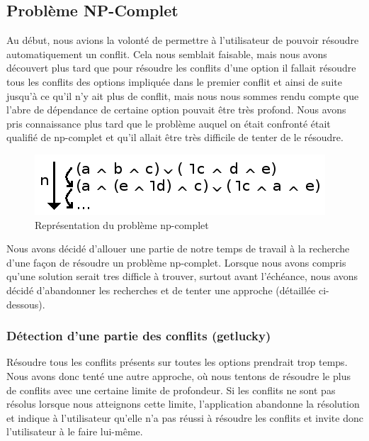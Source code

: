 \documentclass[16pts]{report}
\begin{document}
        \subsection{Problème NP-Complet}
        \label{sub:Problème NP-Complet}

Au début, nous avions la volonté de permettre à l'utilisateur de pouvoir
résoudre automatiquement un conflit. Cela nous semblait faisable, mais 
nous avons découvert plus tard que pour résoudre les conflits d'une option
il fallait résoudre tous les conflits des options impliquée dans le premier
conflit et ainsi de suite jusqu'à ce qu'il n'y ait plus de conflit, mais nous 
nous sommes rendu compte que l'abre de dépendance de certaine option pouvait être 
très profond. Nous avons pris connaissance plus tard que le problème auquel on 
était confronté était qualifié de np-complet et qu'il allait être très difficile
de tenter de le résoudre. 

%




\begin{figure}[H]
	\includegraphics[scale=1]{./illustrations/np_complet.png}
	\centering
	\caption{Représentation du problème np-complet}
	\label{fig:np-complet}
\end{figure}

Nous avons décidé d'allouer une partie de notre temps de travail à la recherche
d'une façon de résoudre un problème np-complet. Lorsque nous avons compris 
qu'une solution serait tres difficle à trouver, surtout avant l'échéance, nous
avons décidé d'abandonner les recherches et de tenter une approche (détaillée
ci-dessous).


        \subsubsection{Détection d'une partie des conflits (getlucky)}
            \label{sub:Problème NP-Complet (getlucky)}

Résoudre tous les conflits présents sur toutes les options prendrait trop temps.
Nous avons donc tenté une autre approche, où nous tentons de résoudre le plus 
de conflits avec une certaine limite de profondeur. Si les conflits ne sont pas
résolus lorsque nous atteignons cette limite, l'application abandonne la 
résolution et indique à l'utilisateur qu'elle n'a pas réussi à résoudre les 
conflits et invite donc l'utilisateur à le faire lui-même.\\
\end{document}
